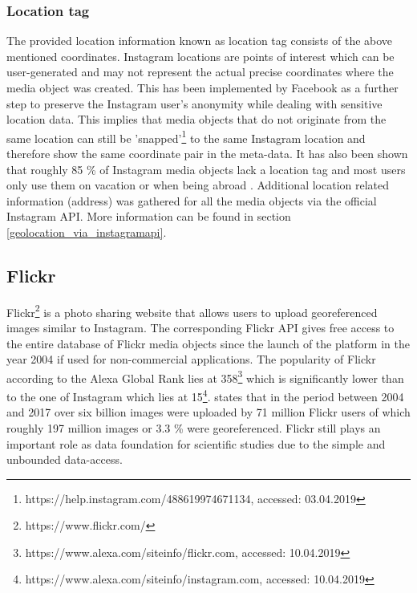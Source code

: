 \subsubsection{Location tag} \label{instagram_location_tag}
The provided location information known as location tag consists of the above mentioned coordinates. Instagram locations are points of interest which can be user-generated and may not represent the actual precise coordinates where the media object was created. This has been implemented by Facebook as a further step to preserve the Instagram user's anonymity while dealing with sensitive location data. This implies that media objects that do not originate from the same location can still be 'snapped'\footnote{https://help.instagram.com/488619974671134, accessed: 03.04.2019} to the same Instagram location and therefore show the same coordinate pair in the meta-data.
It has also been shown that roughly 85 \% of Instagram media objects lack a location tag and most users only use them on vacation or when being abroad \parencite{Flatow2015}.
Additional location related information (address) was gathered for all the media objects via the official Instagram API. More information can be found in section \ref{geolocation_via_instagramapi}.



\subsection{Flickr} \label{flickr}
Flickr\footnote{https://www.flickr.com/} is a photo sharing website that allows users to upload georeferenced images similar to Instagram. The corresponding Flickr API gives free\renewcommand{\thefootnote}{\alph{footnote}} access to the entire database of Flickr media objects since the launch of the platform in the year 2004 if used for non-commercial applications. The popularity of Flickr according to the Alexa Global Rank lies at 358\footnote{https://www.alexa.com/siteinfo/flickr.com, accessed: 10.04.2019} which is significantly lower than to the one of Instagram which lies at 15\footnote{https://www.alexa.com/siteinfo/instagram.com, accessed: 10.04.2019}. \textcite{Tenkanen2017} states that in the period between 2004 and 2017 over six billion images were uploaded by 71 million Flickr users of which roughly 197 million images or 3.3 \% were georeferenced.\renewcommand{\thefootnote}{\arabic{footnote}} Flickr still plays an important role as data foundation for scientific studies due to the simple and unbounded data-access.

